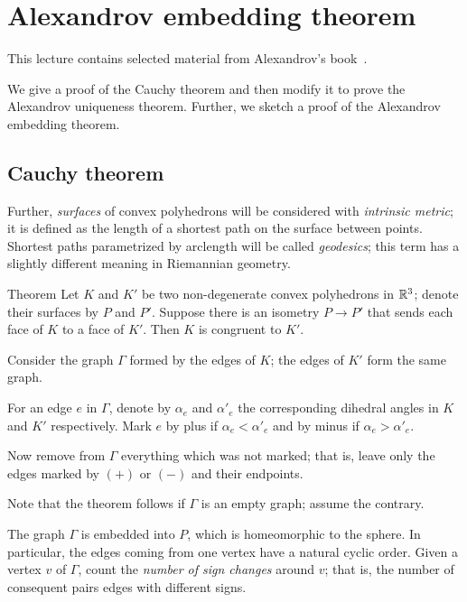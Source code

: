 \chapter{Alexandrov embedding theorem}

This lecture contains selected material from Alexandrov's book~\cite{alexandrov}.

We give a proof of the Cauchy theorem and then modify it to prove the Alexandrov uniqueness theorem.
Further, we sketch a proof of the Alexandrov embedding theorem.


\section{Cauchy theorem}

Further, \emph{surfaces} of convex polyhedrons will be considered with \emph{intrinsic metric}; it is defined as the length of a shortest path on the surface between points.
Shortest paths parametrized by arclength will be called \emph{geodesics}; 
this term has a slightly different meaning in Riemannian geometry.
 
\begin{thm}{Theorem}\label{thm:cauchy} Let $K$ and $K'$ be two non-degenerate convex polyhedrons in $\mathbb{R}^3$;
denote their surfaces 
by $P$ and $P'$.
Suppose there is an isometry $P\to P'$ that sends each face of $K$ to a face of $K'$.
Then $K$ is congruent to $K'$.
\end{thm}

Consider the graph $\Gamma$ formed by the edges of $K$;
the edges of $K'$ form the same graph.
 
For an edge $e$ in $\Gamma$, denote by $\alpha_e$ and $\alpha'_e$ the corresponding dihedral angles in $K$ and $K'$ respectively.
Mark $e$ by plus if $\alpha_e < \alpha'_e$ and by minus if $\alpha_e > \alpha'_e$.

Now remove from $\Gamma$ everything which was not marked;
that is, leave only the edges marked by $(+)$ or $(-)$ and their endpoints.

Note that the theorem follows if $\Gamma$ is an empty graph;
assume the contrary.

The graph $\Gamma$ is embedded into $P$, which is homeomorphic to the sphere.
In particular, the edges coming from one vertex have a natural cyclic order. 
Given a vertex $v$ of $\Gamma$, count the \emph{number of sign changes} around $v$;
that is, the number of consequent pairs edges with different signs. 

